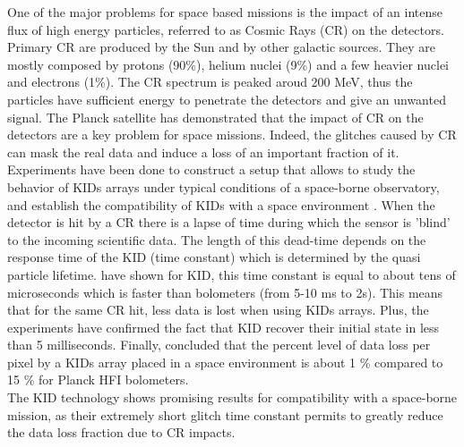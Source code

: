 One of the major problems for space based missions is the impact of an intense flux of high energy particles, referred to as Cosmic Rays (CR) on the detectors. Primary CR are produced by the Sun and by other galactic sources. They are mostly composed by protons (90\%), helium nuclei (9\%) and a few heavier nuclei and electrons (1\%). The CR spectrum is peaked aroud 200 MeV, thus the particles have sufficient energy to penetrate the detectors and give an unwanted signal. The Planck satellite \citep{2014A&A...571A..10P} has demonstrated that the impact of CR on the detectors are a key problem for space missions. Indeed, the glitches caused by CR can mask the real data and induce a loss of an important fraction of it.\\
Experiments have been done to construct a setup that allows to study the behavior of KIDs arrays under typical conditions of a space-borne observatory, and establish the compatibility of KIDs with a space environment \citep{2016A&A...592A..26C,2016SPIE.9914E..0NM}. When the detector is hit by a CR there is a lapse of time during which the sensor is 'blind' to the incoming scientific data. The length of this dead-time depends on the response time of the KID (time constant) which is determined by the quasi particle lifetime. \citet{2012ApPhL.100w2601M} have shown for KID, this time constant is equal to about tens of microseconds which is faster than bolometers (from 5-10 ms to 2s). This means that for the same CR hit, less data is lost when using KIDs arrays. Plus, the experiments have confirmed the fact that KID recover their initial state in less than 5 milliseconds. Finally, \citet{2016SPIE.9914E..0NM} concluded that the percent level of data loss per pixel by a KIDs array placed in a space environment is about 1 \% compared to 15 \% for Planck HFI bolometers.\\ The KID technology shows promising results for compatibility with a space-borne mission, as their extremely short glitch time constant permits to greatly reduce the data loss fraction due to CR impacts. 

